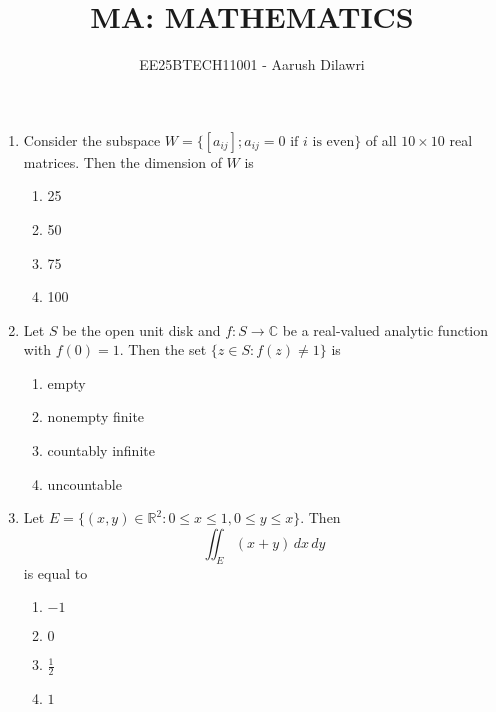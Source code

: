 \documentclass[journal,12pt,onecolumn]{IEEEtran}
\title{MA: MATHEMATICS}
\author{EE25BTECH11001 - Aarush Dilawri}
\theoremstyle{remark}
\begin{document}
\maketitle

\begin{enumerate}
\item Consider the subspace $W = \{ [a_{ij}] ; a_{ij} = 0 \text{ if $i$ is even} \}$ of all $10\times 10$ real matrices. Then the dimension of $W$ is  
\\[-0.3em]\makebox[\textwidth][r]{\textit{[GATE EE 2025]}}



\begin{multicols}{4}
\begin{enumerate}[label=(\Alph*)]
\item 25
\item 50
\item 75
\item 100
\end{enumerate}
\end{multicols}

\item Let $S$ be the open unit disk and $f : S \to \mathbb{C}$ be a real-valued analytic function with $f(0) = 1$. Then the set $\{ z \in S : f(z) \neq 1 \}$ is  
\\[-0.3em]\makebox[\textwidth][r]{\textit{[GATE EE 2025]}}

\begin{multicols}{4}
\begin{enumerate}[label=(\Alph*)]
\item empty
\item nonempty finite
\item countably infinite
\item uncountable
\end{enumerate}
\end{multicols}

\item Let $E = \{ (x,y) \in \mathbb{R}^2 : 0 \le x \le 1, 0 \le y \le x \}$. Then  
\[
\iint_E (x + y) \, dx \, dy
\]
is equal to 
\\[-0.3em]\makebox[\textwidth][r]{\textit{[GATE EE 2025]}}

\begin{multicols}{4}
\begin{enumerate}[label=(\Alph*)]
\item $-1$
\item $0$
\item $\frac12$
\item $1$
\end{enumerate}
\end{multicols}


\end{enumerate}
\end{document}
